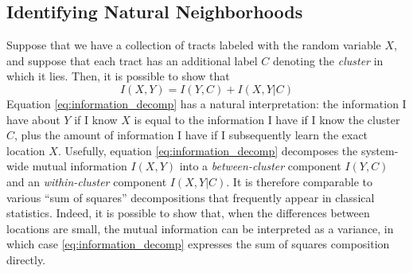 	\subsection{Identifying Natural Neighborhoods}
		Suppose that we have a collection of tracts labeled with the random variable $X$, and suppose that each tract has an additional label $C$ denoting the \emph{cluster} in which it lies. Then, it is possible to show that 
		\begin{equation}
			I(X,Y) = I(Y,C) + I(X,Y|C) \label{eq:information_decomp}
		\end{equation}
		Equation \eqref{eq:information_decomp} has a natural interpretation: the information I have about $Y$ if I know $X$ is equal to the  information I have if I know the cluster $C$, plus the amount of information I have if I subsequently learn the exact location $X$. Usefully, equation \eqref{eq:information_decomp} decomposes the system-wide mutual information $I(X,Y)$ into a \emph{between-cluster} component $I(Y,C)$ and an \emph{within-cluster} component $I(X,Y|C)$. It is therefore comparable to various ``sum of squares'' decompositions that frequently appear in classical statistics. Indeed, it is possible to show that, when the differences between locations are small, the mutual information can be interpreted as a variance, in which case \eqref{eq:information_decomp} expresses the sum of squares composition directly. 

